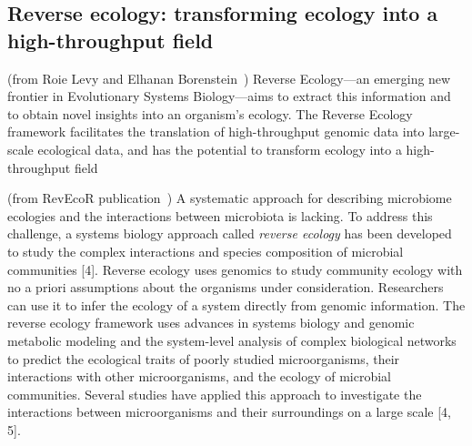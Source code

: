       
      
    

   \subsection{Reverse ecology: transforming ecology into a high-throughput field}



      (from Roie Levy and Elhanan Borenstein~\cite{levy2012reverse})
      Reverse Ecology—an emerging new frontier in Evolutionary Systems Biology—aims
      to extract this information and to obtain novel insights into an organism’s ecology.
      The Reverse Ecology framework facilitates the translation of high-throughput
      genomic data into large-scale ecological data, and has the potential to transform
      ecology into a high-throughput field




      (from RevEcoR publication~\cite{cao2016revecor})
      A systematic approach for describing microbiome ecologies and the interactions between microbiota is lacking. 
      To address this challenge, a systems biology approach called \textit{reverse ecology} has been developed 
      to study the complex interactions and species composition of microbial communities [4]. 
      Reverse ecology uses genomics to study community ecology with no a priori assumptions about the organisms under consideration. 
      Researchers can use it to infer the ecology of a system directly from genomic information. 
      The reverse ecology framework uses advances in systems biology and genomic metabolic modeling and 
      the system-level analysis of complex biological networks to predict the ecological traits of poorly studied microorganisms, 
      their interactions with other microorganisms, and the ecology of microbial communities. 
      Several studies have applied this approach to investigate the interactions between microorganisms 
      and their surroundings on a large scale [4, 5].

